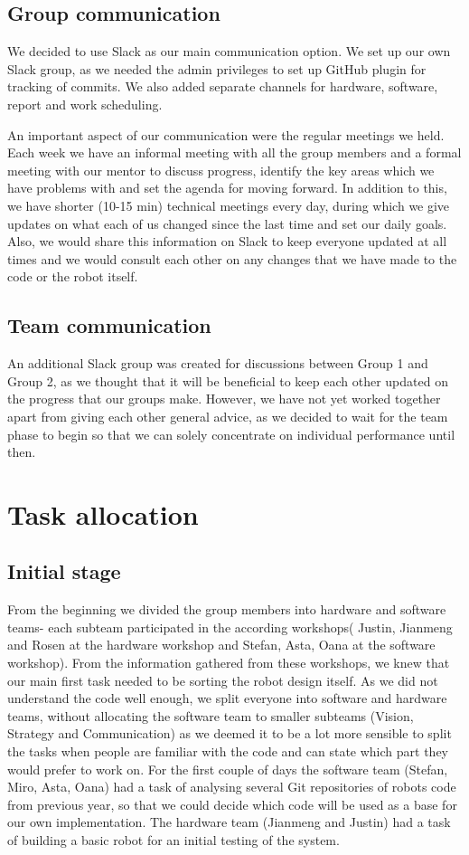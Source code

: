 \documentclass[12pt,oneside]{article}
\begin{document}
	\subsection{Group communication}
		We decided to use Slack as our main communication option. We set up our own Slack group, as we needed the admin privileges to set up GitHub plugin for tracking of commits. We also added separate channels for hardware, software, report and work scheduling.
		
		An important aspect of our communication were the regular meetings we held. Each week we have an informal meeting with all the group members and a formal meeting with our mentor to discuss progress, identify the key areas which we have problems with and set the agenda for moving forward. In addition to this, we have shorter (10-15 min) technical meetings every day, during which we give updates on what each of us changed since the last time and set our daily goals. Also, we would share this information on Slack to keep everyone updated at all times and we would consult each other on any changes that we have made to the code or the robot itself.
	\subsection{Team communication}
		An additional Slack group was created for discussions between Group 1 and Group 2, as we thought that it will be beneficial to keep each other updated on the progress that our groups make. However, we have not yet worked together apart from giving each other general advice, as we decided to wait for the team phase to begin so that we can solely concentrate on individual performance until then.
		
	\section{Task allocation}
	\subsection{Initial stage}
		From the beginning we divided the group members into hardware and software teams- each subteam participated in the according workshops( Justin, Jianmeng and Rosen at the hardware workshop and Stefan, Asta, Oana at the software workshop). From the information gathered from these workshops, we knew that our main first task needed to be sorting the robot design itself. As we did not understand the code well enough, we split everyone into software and hardware teams, without allocating the software team to smaller subteams (Vision, Strategy and Communication) as we deemed it to be a lot more sensible to split the tasks when people are familiar with the code and can state which part they would prefer to work on. For the first couple of days the software team (Stefan, Miro, Asta, Oana) had a task of analysing several Git repositories of robots code from previous year, so that we could decide which code will be used as a base for our own implementation. The hardware team (Jianmeng and Justin) had a task of building a basic robot for an initial testing of the system.
\end{document}
